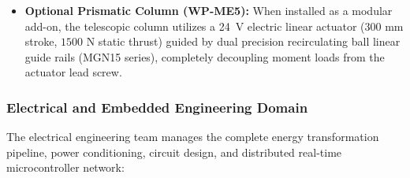 \begin{itemize}[leftmargin=1.5em]
  \item \textbf{Optional Prismatic Column (WP-ME5):} When installed as a modular add-on, the telescopic column utilizes a 24~V electric linear actuator ($300\text{ mm}$ stroke, $1500\text{ N}$ static thrust) guided by dual precision recirculating ball linear guide rails (MGN15 series), completely decoupling moment loads from the actuator lead screw.
\end{itemize}

\subsubsection{Electrical and Embedded Engineering Domain}
The electrical engineering team manages the complete energy transformation pipeline, power conditioning, circuit design, and distributed real-time microcontroller network:
